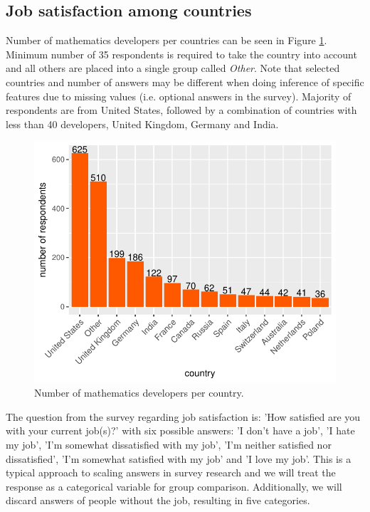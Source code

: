 \documentclass{article}
\begin{document}
\subsection{Job satisfaction among countries}
Number of mathematics developers per countries can be seen in Figure \ref{fig_0}. Minimum number of 35 respondents is required to take the country into account and all others are placed into a single group called \textit{Other}. Note that selected countries and number of answers may be different when doing inference of specific features due to missing values (i.e. optional answers in the survey). Majority of respondents are from United States, followed by a combination of countries with less than 40 developers, United Kingdom, Germany and India.


\begin{figure}[H]
\centering
\includegraphics{report-005}
\caption{Number of mathematics developers per country.}\label{fig_0}
\end{figure}

The question from the survey regarding job satisfaction is: 'How satisfied are you with your current job(s)?' with six possible answers: 'I don't have a job', 'I hate my job', 'I'm somewhat dissatisfied with my job', 'I'm neither satisfied nor dissatisfied', 'I'm somewhat satisfied with my job' and 'I love my job'. This is a typical approach to scaling answers in survey research and we will treat the response as a categorical variable for group comparison. Additionally, we will discard answers of people without the job, resulting in five categories.
\end{document}
